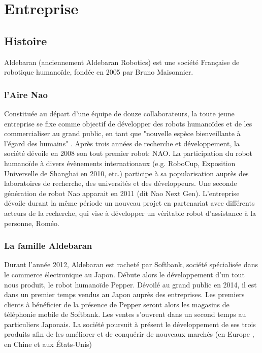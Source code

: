 \chapter*{Entreprise}
\label{Entreprise}
\thispagestyle{fancy}

\section{Histoire}
\label{Entreprise: histoire}
Aldebaran (anciennement Aldebaran Robotics) est une société Française de robotique humanoïde, fondée en 2005 par Bruno Maisonnier. 

\subsection{l'Aire Nao}
\label{Entreprise:Histoire:Nao}
Constituée au départ d'une équipe de douze collaborateurs, la toute jeune entreprise se fixe comme objectif de développer des robots humanoïdes et de les commercialiser au grand public, en tant que "nouvelle espèce bienveillante à l'égard des humains" . Après trois années de recherche et développement, la société dévoile en 2008 son tout premier robot: NAO. La participation du robot humanoïde à divers évènements internationaux (e.g. RoboCup, Exposition Universelle de Shanghai en 2010, etc.) participe à sa popularisation auprès des laboratoires de recherche, des universités et des développeurs. Une seconde génération de robot Nao apparait en 2011 (dit Nao Next Gen). L'entreprise dévoile durant la même période un nouveau projet en partenariat avec différents acteurs de la recherche,  qui vise à développer un véritable robot d'assistance à la personne, Roméo. 

\subsection{La famille Aldebaran}
\label{Entreprise: La famille Aldebaran}
Durant l'année 2012, Aldebaran est racheté par Softbank, société spécialisée dans le commerce électronique au Japon. Débute alors le développement d'un tout nous produit, le robot humanoïde Pepper. Dévoilé au grand public en 2014, il est dans un premier temps vendus au Japon auprès des entreprises. Les premiers clients à bénéficier de la présence de Pepper seront alors les magasins de téléphonie mobile de Softbank. Les ventes s'ouvrent dans un second temps au particuliers Japonais. La société poursuit à présent le développement de ses trois produits afin de les améliorer et de conquérir de nouveaux marchés (en Europe , en Chine et aux États-Unis)

